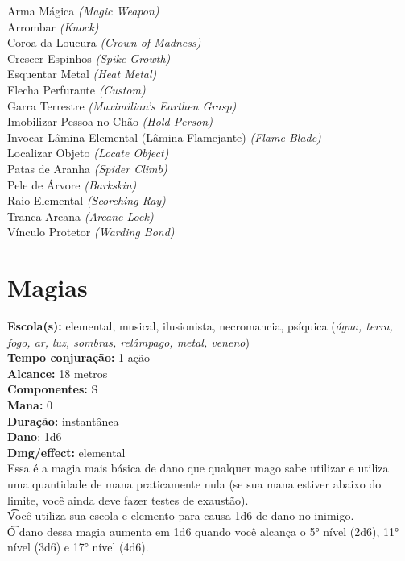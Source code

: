 \documentclass{RPG_Adventure}[2021/10/20]
\begin{document}
{\normalsize Arma Mágica \textit{(Magic Weapon)}\\ }
{\normalsize Arrombar \textit{(Knock)}\\ }
{\normalsize Coroa da Loucura \textit{(Crown of Madness)}\\ }
{\normalsize Crescer Espinhos \textit{(Spike Growth)}\\ }
{\normalsize Esquentar Metal \textit{(Heat Metal)}\\ }
{\normalsize Flecha Perfurante \textit{(Custom)}\\ }
{\normalsize Garra Terrestre \textit{(Maximilian's Earthen Grasp)}\\ }
{\normalsize Imobilizar Pessoa no Chão \textit{(Hold Person)}\\ }
{\normalsize Invocar Lâmina Elemental (Lâmina Flamejante) \textit{(Flame Blade)}\\ }
{\normalsize Localizar Objeto \textit{(Locate Object)}\\ }
{\normalsize Patas de Aranha \textit{(Spider Climb)}\\ }
{\normalsize Pele de Árvore \textit{(Barkskin)}\\ }
{\normalsize Raio Elemental \textit{(Scorching Ray)}\\ }
{\normalsize Tranca Arcana \textit{(Arcane Lock)}\\ }
{\normalsize Vínculo Protetor \textit{(Warding Bond)}\\ }
\jump\chapter{Magias}\n\n{}
{\small \t \textbf{Escola(s):} elemental, musical, ilusionista, necromancia, psíquica (\textit{água, terra, fogo, ar, luz, sombras, relâmpago, metal, veneno})\\\t \textbf{Tempo conjuração:} 1 ação\\\t \textbf{Alcance:} 18 metros\\\t \textbf{Componentes:} S\\\t \textbf{Mana:} 0\\\t \textbf{Duração:} instantânea\\\t \textbf{Dano}: 1d6\\\t \textbf{Dmg/effect:} elemental\\}
{\normalsize Essa é a magia mais básica de dano que qualquer mago sabe utilizar e utiliza uma quantidade de mana praticamente nula (se sua mana estiver abaixo do limite, você ainda deve fazer testes de exaustão).\\\t Você utiliza sua escola e elemento para causa 1d6 de dano no inimigo.\\\t O dano dessa magia aumenta em 1d6 quando você alcança o 5° nível (2d6), 11° nível (3d6) e 17° nível (4d6).\\}
\end{document}
